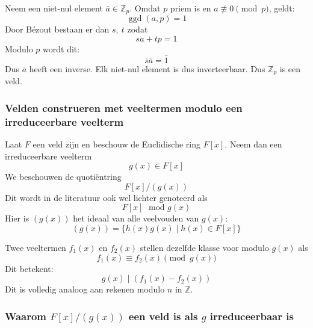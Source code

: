 \textbf{} Neem een niet-nul element $\bar{a} \in \mathbb{Z}_p$. Omdat $p$ priem is en $a \not\equiv 0 \pmod p$, geldt:
\begin{equation*}
    \operatorname{ggd}(a,p) = 1
\end{equation*}
Door Bézout bestaan er dan $s,\ t$ zodat
\begin{equation*}
    sa + tp = 1
\end{equation*}
Modulo $p$ wordt dit:
\begin{equation*}
    \bar{s}\bar{a} = \bar{1}
\end{equation*}
Dus $\bar{a}$ heeft een inverse. Elk niet-nul element is dus inverteerbaar. Dus $\mathbb{Z}_p$ is een veld.

\subsubsection{Velden construeren met veeltermen modulo een irreduceerbare veelterm}


Laat $F$ een veld zijn en beschouw de Euclidische ring $F[x]$. Neem dan een irreduceerbare veelterm
\begin{equation*}
    g(x) \in F[x]
\end{equation*}
We beschouwen de quotiëntring
\begin{equation*}
    F[x]/(g(x))
\end{equation*}
Dit wordt in de literatuur ook wel lichter genoteerd als 
\begin{equation*}
    F[x] \;\text{ mod } g(x)
\end{equation*}
Hier is $(g(x))$ het ideaal van alle veelvouden van $g(x)$:
\begin{equation*}
    (g(x)) = \{h(x)g(x) \mid h(x) \in F[x]\}
\end{equation*}


Twee veeltermen $f_1(x)$ en $f_2(x)$ stellen dezelfde klasse voor modulo $g(x)$ als
\begin{equation*}
    f_1(x) \equiv f_2(x) \pmod{g(x)}
\end{equation*}
Dit betekent:
\begin{equation*}
    g(x) \mid (f_1(x) - f_2(x))
\end{equation*}
Dit is volledig analoog aan rekenen modulo $n$ in $\mathbb{Z}$.

\subsubsection{Waarom \texorpdfstring{$F[x]/(g(x))$}{F[x]/(g(x))} een veld is als \texorpdfstring{$g$}{g} irreduceerbaar is}

